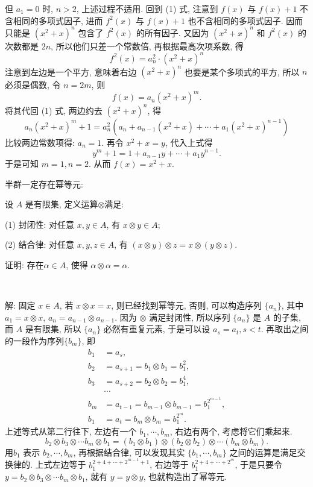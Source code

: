 但 $a_1=0$ 时, $n > 2$, 上述过程不适用. 回到 (1) 式, 注意到 $f(x)$ 与 $f(x)+1$ 不含相同的多项式因子, 进而 $f^2(x)$ 与 $f(x)+1$ 也不含相同的多项式因子. 因而只能是 $(x^2+x)^n$ 包含了 $f^2(x)$ 的所有因子. 又因为 $(x^2+x)^n$ 和 $f^2(x)$ 的次数都是 $2n$, 所以他们只差一个常数倍, 再根据最高次项系数, 得
\[ f^2(x) = a_n^2\cdot(x^2+x)^n \]
注意到左边是一个平方, 意味着右边 $(x^2+x)^n$ 也要是某个多项式的平方, 所以 $n$ 必须是偶数, 令 $n=2m$, 则
\[f(x) = a_n(x^2+x)^m .\]
将其代回 (1) 式, 两边约去 $(x^2+x)^n$, 得
\[ a_n(x^2+x)^m + 1 = a_n^2(a_n + a_{n-1}(x^2+x) + \cdots + a_1(x^2+x)^{n-1}) \]
比较两边常数项得: $a_n=1$. 再令 $x^2+x = y$, 代入上式得
\[y^m+1 = 1+a_{n-1}y+\cdots + a_1y^{n-1} .\]
于是可知 $m=1, n=2$. 从而 $f(x) = x^2 + x$.

\newpage
\noindent 半群一定存在幂等元:

设 $A$ 是有限集, 定义运算$\otimes$满足:

(1) 封闭性: 对任意 $x,y\in A$, 有 $x\otimes y\in A$;

(2) 结合律: 对任意 $x,y,z\in A$, 有 $(x\otimes y)\otimes z = x\otimes(y\otimes z)$.

证明: 存在$\alpha\in A$, 使得 $\alpha\otimes\alpha=\alpha$.


~

解: 固定 $x\in A$, 若 $x\otimes x = x$, 则已经找到幂等元, 否则, 可以构造序列 $\{a_n\}$, 其中 $a_1=x\otimes x$, $a_{n}=a_{n-1}\otimes a_{n-1}$. 因为 $\otimes$ 满足封闭性, 所以序列 $\{a_n\}$ 是 $A$ 的子集, 而 $A$  是有限集, 所以 $\{a_n\}$ 必然有重复元素, 于是可以设 $a_s = a_t, s<t$. 再取出之间的一段作为序列$\{b_m\}$, 即
\begin{align*}
b_1&=a_s,\\ 
b_2&=a_{s+1}=b_1\otimes b_1 = b_1^2,\\ 
b_3&=a_{s+2}=b_2\otimes b_2 = b_1^4,\\
&\cdots\\ 
b_m&=a_{t-1} = b_{m-1}\otimes b_{m-1} = b_1^{2^{m-1}},\\
b_1&=a_t=b_{m}\otimes b_m=b_1^{2^m}.
\end{align*}
上述等式从第二行往下, 左边有一个 $b_1, \cdots, b_m$, 右边有两个, 考虑将它们乘起来.
\[b_2\otimes b_3\otimes\cdots b_m\otimes b_1 = (b_1\otimes b_1)\otimes(b_2\otimes b_2)\otimes\cdots(b_m\otimes b_m).\]
用$b_1$ 表示 $b_2,\cdots,b_m$, 再根据结合律, 可以发现其实 $\{b_1, \cdots, b_m\}$ 之间的运算是满足交换律的. 上式左边等于 $b_1^{2+4+\cdots+2^{m-1}+1}$, 右边等于 $b_1^{2+4+\cdots+2^m}$, 于是只要令 $y=b_2\otimes b_3\otimes\cdots b_m\otimes b_1$, 就有 $y=y\otimes y$, 也就构造出了幂等元.

